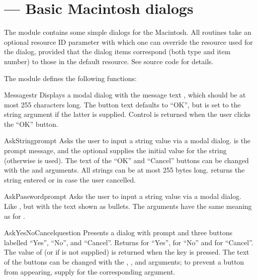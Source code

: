 \section{ ---
         Basic Macintosh dialogs}


The  module contains some simple dialogs for the
Macintosh. All routines take an optional resource ID parameter 
with which one can override the  resource used for the
dialog, provided that the dialog items correspond (both type and item
number) to those in the default  resource. See source
code for details.

The  module defines the following functions:


\begin{funcdesc}{Message}{str}
Displays a modal dialog with the message text , which should be
at most 255 characters long. The button text defaults to ``OK'', but is
set to the string argument  if the latter is supplied. Control
is returned when the user clicks the ``OK'' button.
\end{funcdesc}


\begin{funcdesc}{AskString}{prompt}
Asks the user to input a string value via a modal dialog. 
is the prompt message, and the optional  supplies the
initial value for the string (otherwise  is used). The text of
the ``OK'' and ``Cancel'' buttons can be changed with the  and
 arguments. All strings can be at most 255 bytes long.
 returns the string entered or 
in case the user cancelled.
\end{funcdesc}


\begin{funcdesc}{AskPassword}{prompt}
Asks the user to input a string value via a modal dialog. Like
, but with the text shown as bullets. The
arguments have the same meaning as for .
\end{funcdesc}


\begin{funcdesc}{AskYesNoCancel}{question}
Presents a dialog with prompt  and three buttons labelled
``Yes'', ``No'', and ``Cancel''. Returns  for ``Yes'', 
for ``No'' and  for ``Cancel''. The value of  (or
 if  is not supplied) is returned when the
 key is pressed. The text of the buttons can be changed with
the , , and  arguments; to prevent a button
from appearing, supply  for the corresponding argument.
\end{funcdesc}


